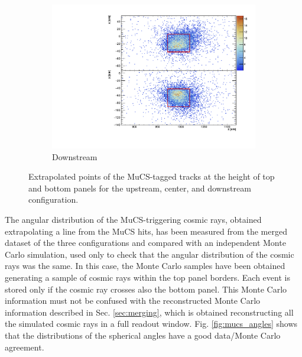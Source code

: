 \documentclass[a4paper]{scrartcl}
\begin{document}
\begin{figure}[htbp]
  \begin{subfigure}{0.32\textwidth}
    \includegraphics[width=\linewidth]{figures/downstream.pdf}
    \caption{Downstream} \label{fig:downstream_align}
  \end{subfigure}

  \caption{Extrapolated points of the MuCS-tagged tracks at the height of top and bottom panels for the upstream, center, and downstream configuration.} \label{fig:alignment}
\end{figure}

The angular distribution of the MuCS-triggering cosmic rays, obtained extrapolating a line from the MuCS hits, has been measured from the merged dataset of the three configurations and compared with an independent Monte Carlo simulation, used only to check that the angular distribution of the cosmic rays was the same.  In this case, the Monte Carlo samples have been obtained generating a sample of cosmic rays within the top panel borders. Each event is stored only if the cosmic ray crosses also the bottom panel. This Monte Carlo information must not be confused with the reconstructed Monte Carlo information described in Sec. \ref{sec:merging}, which is obtained reconstructing all the simulated cosmic rays in a full readout window. Fig. \ref{fig:mucs_angles} shows that the distributions of the spherical angles have a good data/Monte Carlo agreement.
\end{document}
